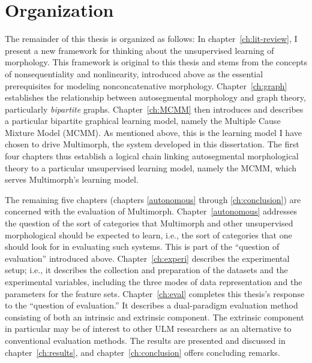 \section{Organization}
The remainder of this thesis is organized as follows: In chapter~\ref{ch:lit-review}, I present a new framework for thinking about the unsupervised learning of morphology. This framework is original to this thesis and stems from the concepts of nonsequentiality and nonlinearity, introduced above as the essential prerequisites for modeling nonconcatenative morphology. Chapter~\ref{ch:graph} establishes the relationship between autosegmental morphology and graph theory, particularly \emph{bipartite} graphs. Chapter~\ref{ch:MCMM} then introduces and describes a particular bipartite graphical learning model, namely the Multiple Cause Mixture Model (MCMM). As mentioned above, this is the learning model I have chosen to drive Multimorph, the system developed in this dissertation. The first four chapters thus establish a logical chain linking autosegmental morphological theory to a particular unsupervised learning model, namely the MCMM, which serves Multimorph's learning model. 

The remaining five chapters (chapters \ref{autonomous} through \ref{ch:conclusion}) are concerned with the evaluation of Multimorph. Chapter~\ref{autonomous} addresses the question of the sort of categories that Multimorph and other unsupervised morphological should be expected to learn, i.e., the sort of categories that one should look for in evaluating such systems. This is part of the ``question of evaluation'' introduced above. Chapter~\ref{ch:experi} describes the experimental setup; i.e., it describes the collection and preparation of the datasets and the experimental variables, including the three modes of data representation and the parameters for the feature sets. Chapter~\ref{ch:eval} completes this thesis's response to the ``question of evaluation.'' It describes a dual-paradigm evaluation method consisting of both an intrinsic and extrinsic component. The extrinsic component in particular may be of interest to other ULM researchers as an alternative to conventional evaluation methods. The results are presented and discussed in chapter~\ref{ch:results}, and chapter~\ref{ch:conclusion} offers concluding remarks.


